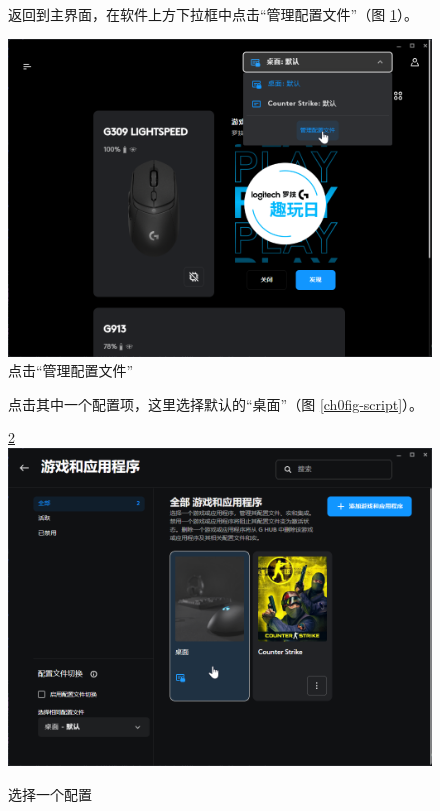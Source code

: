 \begin{figure}[H]
    \Centering
    \parbox[l]{\textwidth}{返回到主界面，在软件上方下拉框中点击“管理配置文件”（图 \ref{ch0fig-manage-configs}）。}
    \includegraphics[width=\textwidth]{assets/intro/manage_configs.png}
    \caption{点击“管理配置文件”}
    \label{ch0fig-manage-configs}
\end{figure}

\begin{figure}[H]
    \Centering
    \parbox[l]{\textwidth}{点击其中一个配置项，这里选择默认的“桌面”（图 \ref{ch0fig-script}）。}
    \ref{ch0fig-select-config}
    \includegraphics[width=\textwidth]{assets/intro/select_config.png}
    \caption{选择一个配置}
    \label{ch0fig-select-config}
\end{figure}

